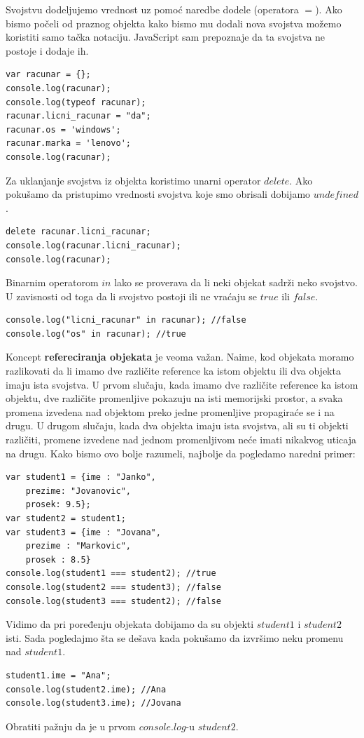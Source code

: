 \documentclass[a4paper]{article}
\begin{document}
Svojstvu dodeljujemo vrednost uz pomoć naredbe dodele (operatora $=$). Ako bismo počeli od praznog objekta kako bismo mu dodali nova svojstva možemo koristiti samo tačka notaciju. JavaScript sam prepoznaje da ta svojstva ne postoje i dodaje ih. 
\begin{lstlisting}[backgroundcolor = \color{lightgray}]
var racunar = {};
console.log(racunar);
console.log(typeof racunar);
racunar.licni_racunar = "da";
racunar.os = 'windows';
racunar.marka = 'lenovo';
console.log(racunar);
\end{lstlisting}
Za uklanjanje svojstva iz objekta koristimo unarni operator $delete$.
Ako pokušamo da pristupimo vrednosti svojstva koje smo obrisali dobijamo $undefined$.
\begin{lstlisting}[backgroundcolor = \color{lightgray}]
delete racunar.licni_racunar;
console.log(racunar.licni_racunar);
console.log(racunar);
\end{lstlisting}

Binarnim operatorom $in$ lako se proverava da li neki objekat sadrži neko svojstvo. U zavisnosti od toga da li svojstvo postoji ili ne vraćaju se $true$ ili $false$.
\begin{lstlisting}[backgroundcolor = \color{lightgray}]
console.log("licni_racunar" in racunar); //false
console.log("os" in racunar); //true
\end{lstlisting}

Koncept \textbf{refereciranja objekata} je veoma važan. Naime, kod objekata moramo razlikovati da li imamo dve različite reference ka istom objektu ili dva objekta imaju ista svojstva. U prvom slučaju, kada imamo dve različite reference ka istom objektu, dve različite promenljive pokazuju na isti memorijski prostor, a svaka promena izvedena nad objektom preko jedne promenljive propagiraće se i na drugu. U drugom slučaju, kada dva objekta imaju ista svojstva, ali su ti objekti različiti, promene izvedene nad jednom promenljivom neće imati nikakvog uticaja na drugu. Kako bismo ovo bolje razumeli, najbolje da pogledamo naredni primer:
\begin{lstlisting}[backgroundcolor = \color{lightgray}]
var student1 = {ime : "Janko",
	prezime: "Jovanovic",
	prosek: 9.5};
var student2 = student1;
var student3 = {ime : "Jovana",
	prezime : "Markovic",
	prosek : 8.5}
console.log(student1 === student2); //true
console.log(student2 === student3); //false
console.log(student3 === student2); //false
\end{lstlisting}
Vidimo da pri poređenju objekata dobijamo da su objekti $student1$ i $student2$ isti. Sada pogledajmo šta se dešava kada pokušamo da izvršimo neku promenu nad $student1$. 
\begin{lstlisting}[backgroundcolor = \color{lightgray}]
student1.ime = "Ana";
console.log(student2.ime); //Ana
console.log(student3.ime); //Jovana
\end{lstlisting}
Obratiti pažnju da je u prvom $console.log$-u $student2$.
\end{document}
